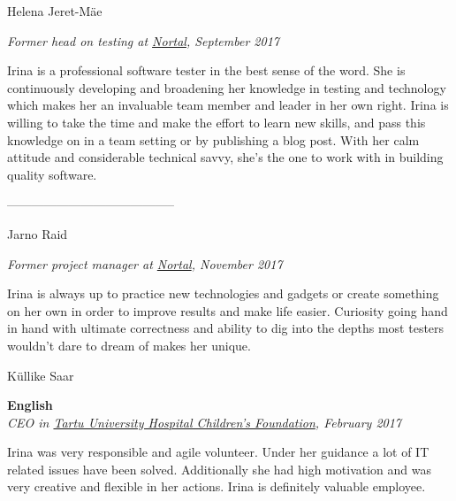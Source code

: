\documentclass[a4paper, 12pt]{article}
\begin{document}
\pagestyle{empty}

\newpage

\begin{center}
\LARGE{Helena Jeret-Mäe}
\end{center}

\begin{center}
\textit{Former head on testing at \href{https://nortal.com}{Nortal}, September 2017}
\end{center}

Irina is a professional software tester in the best sense of the word. She is continuously developing and broadening her knowledge in testing and technology which makes her an invaluable team member and leader in her own right. Irina is willing to take the time and make the effort to learn new skills, and pass this knowledge on in a team setting or by publishing a blog post. With her calm attitude and considerable technical savvy, she's the one to work with in building quality software.

\begin{center}
\------------------------------------------
\end{center}

\begin{center}
\LARGE{Jarno Raid}
\end{center}

\begin{center}
\textit{Former project manager at \href{https://nortal.com}{Nortal}, November 2017}
\end{center}

Irina is always up to practice new technologies and gadgets or create something on her own in order to improve results and make life easier. Curiosity going hand in hand with ultimate correctness and ability to dig into the depths most testers wouldn't dare to dream of makes her unique.

\newpage

\begin{center}
\LARGE{Küllike Saar}
\end{center}

\begin{center}
\textbf{English}\\
\textit{CEO in \href{https://www.lastefond.ee}{Tartu University Hospital Children's Foundation}, February 2017}
\end{center}

Irina was very responsible and agile volunteer. Under her guidance a lot of IT related issues have been solved. Additionally she had high motivation and was very creative and flexible in her actions. Irina is definitely valuable employee.
\end{document}
